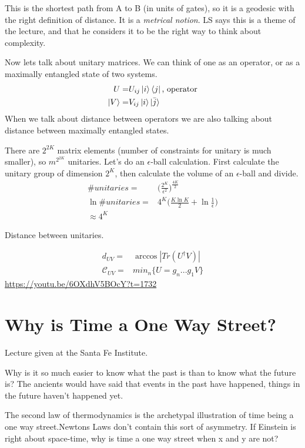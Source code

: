 \documentclass[]{article}
\begin{document}
This is the shortest path from A to B (in units of gates), so it is a geodesic with the right definition of distance. It is a \emph{metrical notion}. LS says this is a theme of the lecture, and that he considers it to be the right way to think about complexity.
 


Now lets talk about unitary matrices. We can think of one as an operator, or as a maximally entangled state of two systems.
\begin{align*}
	U =& U_{ij}\ket{i}\bra{j} \text{, operator}\\
	\ket{V} =& V_{ij}\ket{i} \ket{\bar{j}}
\end{align*}
When we talk about distance between operators we are also talking about distance between maximally entangled states.

There are $2^{2K}$ matrix elements (number of constraints for unitary is much smaller), so $m^{2^{2K}}$ unitaries. Let's do an $\epsilon$-ball calculation. First calculate the unitary group of dimension $2^K$, then calculate the volume of an $\epsilon$-ball and divide.
\begin{align*}
	\#unitaries =& \bigg(\frac{2^K}{\epsilon^2}\bigg)^\frac{4K}{2}\\
	\ln \#unitaries =& 4^K\bigg(\frac{K \ln K}{2} + \ln\frac{1}{\epsilon}\bigg)\\
	\approx 4^K
\end{align*}

Distance between unitaries.

\begin{align*}
	d_{UV}=& \arccos \left|Tr(U^\dagger V)\right|\\
	\mathcal{C}_{UV}=& min_n \{U=g_n...g_1V\}
\end{align*}
\url{https://youtu.be/6OXdhV5BOcY?t=1732}

\section{Why is Time a One Way Street?}

Lecture given at the Santa Fe Institute.\cite{susskind2013why}

Why is it so much easier to know what the past is than to know what the future is? The ancients would have said that events in the past have happened, things in the future haven't happened yet.

The second law of thermodynamics is the archetypal illustration of time being a one way street.Newtons Laws don't contain this sort of asymmetry. If Einstein is right about space-time, why is time a one way street when x and y are not?
\end{document}
